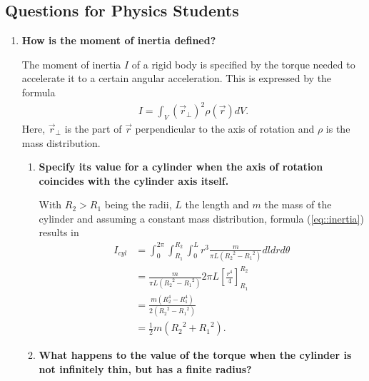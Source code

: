 \subsection{Questions for Physics Students}
\begin{enumerate}
	\item \textbf{How is the moment of inertia defined?}
	
	The moment of inertia $I$ of a rigid body is specified by the torque needed to accelerate it to a certain angular acceleration. This is expressed by the formula
	\begin{align}
		I = \int_{V} (\vec{r}_\perp)^2 \rho (\vec{r}) dV.
		\label{eq::inertia}
	\end{align}
	Here, $\vec{r}_\perp$ is the part of $\vec{r}$ perpendicular to the axis of rotation and $\rho$ is the mass distribution.
	
	\begin{enumerate}
		\item 
		\textbf{Specify its value for a cylinder when the axis of rotation coincides with the cylinder axis itself.}
		
	 	With $R_2 > R_1$ being the radii, $L$ the length and $m$ the mass of the cylinder and assuming a constant mass distribution, formula (\ref{eq::inertia}) results in
		\begin{align*}
			I_{cyl}{}
			&=\int_{0}^{2 \pi} \int_{R_1}^{R_2} \int_{0}^{L} r^3 \frac{m}{\pi L ({R_2}^2 - {R_1}^2)} dl dr d\theta \\
			&= \frac{m}{\pi L ({R_2}^2 - {R_1}^2)} 2 \pi L \left[ \frac{r^4}{4}\right]_{R_1}^{R_2} \\
			&= \frac{m (R_2^4-R_1^4)}{2 ({R_2}^2 - {R_1}^2)} \\
			&= \frac{1}{2}m({R_2}^2 + {R_1}^2).
		\end{align*}

	 	
 		\item
 		\textbf{What happens to the value of the torque when the cylinder is not infinitely thin, but has a finite radius?}
 		
 		
	\end{enumerate}
\end{enumerate}